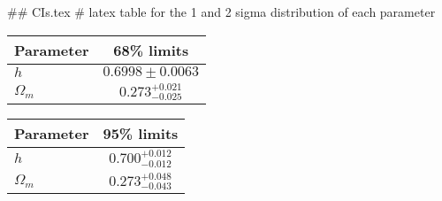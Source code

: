 ## CIs.tex
# latex table for the 1 and 2 sigma distribution of each parameter

\begin{tabular} { l  c}
 Parameter &  68\% limits\\
\hline
{\boldmath$h              $} & $0.6998\pm 0.0063          $\\
{\boldmath$\Omega_m       $} & $0.273^{+0.021}_{-0.025}   $\\
\hline
\end{tabular}

\begin{tabular} { l  c}
 Parameter &  95\% limits\\
\hline
{\boldmath$h              $} & $0.700^{+0.012}_{-0.012}   $\\
{\boldmath$\Omega_m       $} & $0.273^{+0.048}_{-0.043}   $\\
\hline
\end{tabular}
